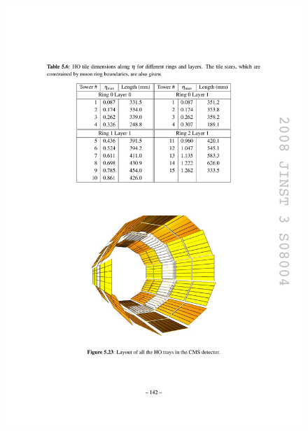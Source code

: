 \begin{figure}[hbtp]
  \begin{center}
    \includegraphics[width=\cmsFigWidth]{figures/cms-hcal-HOtray}

\end{center}
\end{figure}
